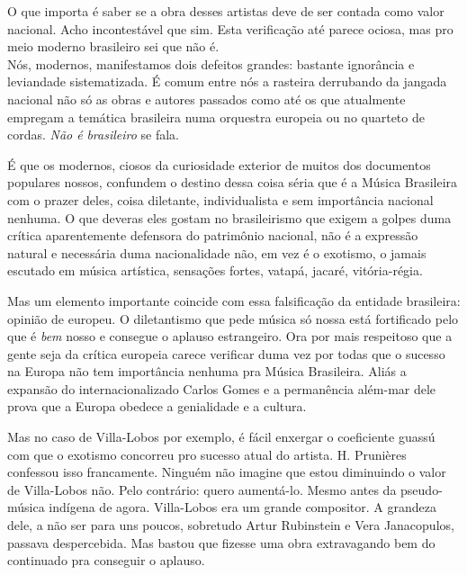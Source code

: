 O que importa é saber se a obra desses artistas deve de ser contada como
valor nacional. Acho incontestável que sim. Esta verificação até parece
ociosa, mas pro meio moderno brasileiro sei que não
é.\\[2\baselineskip]Nós, modernos, manifestamos dois defeitos grandes:
bastante ignorância e leviandade sistematizada. É comum entre nós a
rasteira derrubando da jangada nacional não só as obras e autores
passados como até os que atualmente empregam a temática brasileira numa
orquestra europeia ou no quarteto de cordas. \emph{Não é}
\emph{brasileiro} se fala.

É que os modernos, ciosos da curiosidade exterior de muitos dos
documentos populares nossos, confundem o destino dessa coisa séria que é
a Música Brasileira com o prazer deles, coisa diletante, individualista
e sem importância nacional nenhuma. O que deveras eles gostam no
brasileirismo que exigem a golpes duma crítica aparentemente defensora
do patrimônio nacional, não é a expressão natural e necessária duma
nacionalidade não, em vez é o exotismo, o jamais escutado em música
artística, sensações fortes, vatapá, jacaré, vitória-régia.

Mas um elemento importante coincide com essa falsificação da entidade
brasileira: opinião de europeu. O diletantismo que pede música só nossa
está fortificado pelo que é \emph{bem} nosso e consegue o aplauso
estrangeiro. Ora por mais respeitoso que a gente seja da crítica
europeia carece verificar duma vez por todas que o sucesso na Europa não
tem importância nenhuma pra Música Brasileira. Aliás a expansão do
internacionalizado Carlos Gomes e a permanência além-mar dele prova que
a Europa obedece a genialidade e a cultura.~

Mas no caso de Villa-Lobos por exemplo, é fácil enxergar o coeficiente
guassú com que o exotismo concorreu pro sucesso atual do artista. H.
Prunières confessou isso francamente. Ninguém não imagine que estou
diminuindo o valor de Villa-Lobos não. Pelo contrário: quero aumentá-lo.
Mesmo antes da pseudo-música indígena de agora. Villa-Lobos era um
grande compositor. A grandeza dele, a não ser para uns poucos, sobretudo
Artur Rubinstein e Vera Janacopulos, passava despercebida. Mas bastou
que fizesse uma obra extravagando bem do continuado pra conseguir o
aplauso.~

